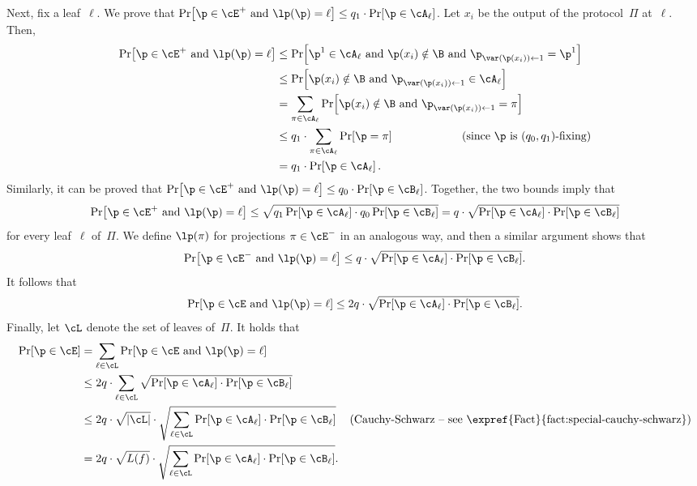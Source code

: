 Next, fix a leaf~$\ell$. We prove that $\Pr\!\left[\p\in\cE^{+}\text{ and }\lp(\p)=\ell\right]\le q_{1}\cdot\Pr\!\left[\p\in\cA_{\ell}\right]$.
Let $x_{i}$ be the output of the protocol~$\Pi$ at~$\ell$. Then,
\begin{align*}
\Pr\!\left[\p\in\cE^{+}\text{ and }\lp(\p)=\ell\right] & \le\Pr\!\left[\p^{1}\in\cA_{\ell}\text{ and }\p(x_{i})\notin\B\text{ and }\p_{\var(\p(x_{i}))\gets1}=\p^{1}\right]\\
 & \le\Pr\!\left[\p(x_{i})\notin\B\text{ and }\p_{\var(\p(x_{i}))\gets1}\in\cA_{\ell}\right]\\
 & =\sum_{\pi\in\cA_{\ell}}\Pr\!\left[\p(x_{i})\notin\B\text{ and }\p_{\var(\p(x_{i}))\gets1}=\pi\right]\\
 & \le q_{1}\cdot\sum_{\pi\in\cA_{\ell}}\Pr\!\left[\p=\pi\right]\qquad\qquad\qquad\text{(since \ensuremath{\p} is \ensuremath{(q_{0},q_{1})}-fixing)}\\
 & =q_{1}\cdot\Pr\!\left[\p\in\cA_{\ell}\right].
\end{align*}
Similarly, it can be proved that $\Pr\!\left[\p\in\cE^{+}\text{ and }\lp(\p)=\ell\right]\le q_{0}\cdot\Pr\!\left[\p\in\cB_{\ell}\right]$.
Together, the two bounds imply that 
\[
\Pr\!\left[\p\in\cE^{+}\text{ and }\lp(\p)=\ell\right]\le\sqrt{q_{1}\Pr\!\left[\p\in\cA_{\ell}\right]\cdot q_{0}\Pr\!\left[\p\in\cB_{\ell}\right]}=q\cdot\sqrt{\Pr\!\left[\p\in\cA_{\ell}\right]\cdot\Pr\!\left[\p\in\cB_{\ell}\right]}
\]
for every leaf~$\ell$ of~$\Pi$. We define $\lp(\pi)$ for projections
$\pi\in\cE^{-}$ in an analogous way, and then a similar argument
shows that 
\[
\Pr\!\left[\p\in\cE^{-}\text{ and }\lp(\p)=\ell\right]\le q\cdot\sqrt{\Pr\!\left[\p\in\cA_{\ell}\right]\cdot\Pr\!\left[\p\in\cB_{\ell}\right]}.
\]
It follows that 
\[
\Pr\!\left[\p\in\cE\text{ and }\lp(\p)=\ell\right]\le2q\cdot\sqrt{\Pr\!\left[\p\in\cA_{\ell}\right]\cdot\Pr\!\left[\p\in\cB_{\ell}\right]}.
\]
Finally, let $\cL$ denote the set of leaves of~$\Pi$. It holds
that 
\begin{align*}
\Pr\!\left[\p\in\cE\right] & =\sum_{\ell\in\cL}\Pr\!\left[\p\in\cE\text{ and }\lp(\p)=\ell\right]\\
 & \le2q\cdot\sum_{\ell\in\cL}\sqrt{\Pr\!\left[\p\in\cA_{\ell}\right]\cdot\Pr\!\left[\p\in\cB_{\ell}\right]}\\
 & \le2q\cdot\sqrt{\left|\cL\right|}\cdot\sqrt{\sum_{\ell\in\cL}\Pr\!\left[\p\in\cA_{\ell}\right]\cdot\Pr\!\left[\p\in\cB_{\ell}\right]} & \text{(Cauchy-Schwarz -- see~\expref{Fact}{fact:special-cauchy-schwarz})}\\
 & =2q\cdot\sqrt{L(f)}\cdot\sqrt{\sum_{\ell\in\cL}\Pr\!\left[\p\in\cA_{\ell}\right]\cdot\Pr\!\left[\p\in\cB_{\ell}\right]}.
\end{align*}
